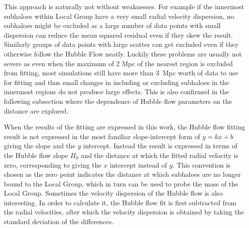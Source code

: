 \documentclass[english, twoside]{HYgradu}
\begin{document}
This approach is naturally not without weaknesses. For example if the innermost subhaloes within Local Group have a very small radial velocity dispersion, no subhaloes might be excluded as a large number of data points with small dispersion can reduce the mean squared residual even if they skew the result. Similarly groups of data points with large scatter can get excluded even if they otherwise follow the Hubble Flow neatly. Luckily these problems are usually not severe as even when the maximum of 2 Mpc of the nearest region is excluded from fitting, most simulations still have more than 3~Mpc worth of data to use for fitting and thus small changes in including or excluding subhaloes in the innermost regions do not produce large effects. This is also confirmed in the following subsection where the dependence of Hubble flow parameters on the distance are explored.


When the results of the fitting are expressed in this work, the Hubble flow fitting result is not expressed in the most familiar slope-intercept form of $y = kx + b$ giving the slope and the $y$ intercept. Instead the result is expressed in terms of the Hubble flow slope $H_0$ and the distance at which the fitted radial velocity is zero, corresponding to giving the $x$ intercept instead of $y$. This convention is chosen as the zero point indicates the distance at which subhaloes are no longer bound to the Local Group, which in turn can be used to probe the mass of the Local Group. Sometimes the velocity dispersion of the Hubble flow is also interesting. In order to calculate it, the Hubble flow fit is first subtracted from the radial velocities, after which the velocity dispersion is obtained by taking the standard deviation of the differences.
\end{document}
